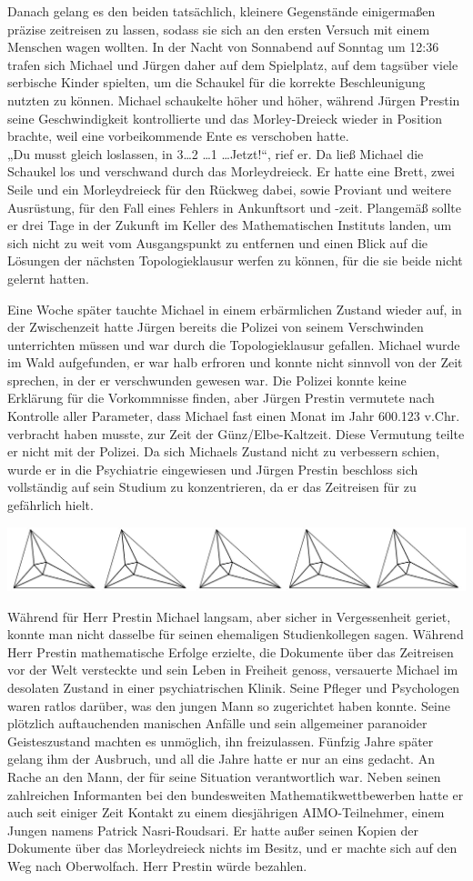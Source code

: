 \documentclass[oneside]{memoir}
\newcommand{\parasep}{
\bigskip
\bigskip
\begin{center} 
   \includegraphics[scale=.08]{parasep5.jpg} 
\end{center}
\bigskip
\bigskip
}
\begin{document}
Danach gelang es den beiden tatsächlich, kleinere Gegenstände einigermaßen präzise zeitreisen zu lassen, sodass sie sich an den ersten Versuch mit einem Menschen wagen wollten. In der Nacht von Sonnabend auf Sonntag um 12:36 trafen sich Michael und Jürgen daher auf dem Spielplatz, auf dem tagsüber viele serbische Kinder spielten, um die Schaukel für die korrekte Beschleunigung nutzten zu können. Michael schaukelte höher und höher, während Jürgen Prestin seine Geschwindigkeit kontrollierte und das Morley-Dreieck wieder in Position brachte, weil eine vorbeikommende Ente es verschoben hatte. \\
„Du musst gleich loslassen, in 3\ldots 2 \ldots 1 \ldots Jetzt!“, rief er.  Da ließ Michael die Schaukel los und verschwand durch das Morleydreieck. Er hatte eine Brett, zwei Seile und ein Morleydreieck für den Rückweg dabei, sowie Proviant und weitere Ausrüstung, für den Fall eines Fehlers in Ankunftsort und -zeit. Plangemäß sollte er drei Tage in der Zukunft im Keller des Mathematischen Instituts landen, um sich nicht zu weit vom Ausgangspunkt zu entfernen und einen Blick auf die Lösungen der nächsten Topologieklausur werfen zu können, für die sie beide nicht gelernt hatten.
 
 Eine Woche später tauchte Michael in einem erbärmlichen Zustand wieder auf, in der Zwischenzeit hatte Jürgen bereits die Polizei von seinem Verschwinden unterrichten müssen und war durch die Topologieklausur gefallen. Michael wurde im Wald aufgefunden, er war halb erfroren und konnte nicht sinnvoll von der Zeit sprechen, in der er verschwunden gewesen war. Die Polizei konnte keine Erklärung für die Vorkommnisse finden, aber Jürgen Prestin vermutete nach Kontrolle aller Parameter, dass Michael fast einen Monat im Jahr 600.123 v.Chr.  verbracht haben musste, zur Zeit der Günz/Elbe-Kaltzeit. Diese Vermutung teilte er nicht mit der Polizei. Da sich Michaels Zustand nicht zu verbessern schien, wurde er in die  Psychiatrie eingewiesen und Jürgen Prestin beschloss sich vollständig auf sein Studium zu konzentrieren, da er das Zeitreisen für zu gefährlich hielt.
 
\parasep

Während für Herr Prestin Michael langsam, aber sicher in Vergessenheit geriet, konnte man nicht dasselbe für seinen ehemaligen Studienkollegen sagen. Während Herr Prestin mathematische Erfolge erzielte, die Dokumente über das Zeitreisen vor der Welt versteckte und sein Leben in Freiheit genoss, versauerte Michael im desolaten Zustand in einer psychiatrischen Klinik. Seine Pfleger und Psychologen waren ratlos darüber, was den jungen Mann so zugerichtet haben konnte. Seine plötzlich auftauchenden manischen Anfälle und sein allgemeiner paranoider Geisteszustand machten es unmöglich, ihn freizulassen. Fünfzig Jahre später gelang ihm der Ausbruch, und all die Jahre hatte er nur an eins gedacht. An Rache an den Mann, der für seine Situation verantwortlich war. Neben seinen zahlreichen Informanten bei den bundesweiten Mathematikwettbewerben hatte er auch seit einiger Zeit Kontakt zu einem diesjährigen AIMO-Teilnehmer, einem Jungen namens Patrick Nasri-Roudsari. Er hatte außer seinen Kopien der Dokumente über das Morleydreieck nichts im Besitz, und er machte sich auf den Weg nach Oberwolfach. Herr Prestin würde bezahlen.
\end{document}
